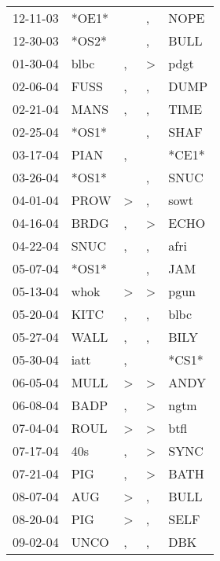 \begin{supertabular}{lllll}
 12-11-03 &  *OE1* &                  &                , &   NOPE \\
 12-30-03 &  *OS2* &                  &                , &   BULL \\
 01-30-04 &   blbc &                , &     \textgreater &   pdgt \\
 02-06-04 &   FUSS &                , &                , &   DUMP \\
 02-21-04 &   MANS &                , &                , &   TIME \\
 02-25-04 &  *OS1* &                  &                , &   SHAF \\
 03-17-04 &   PIAN &                , &                  &  *CE1* \\
 03-26-04 &  *OS1* &                  &                , &   SNUC \\
 04-01-04 &   PROW &     \textgreater &                , &   sowt \\
 04-16-04 &   BRDG &                , &     \textgreater &   ECHO \\
 04-22-04 &   SNUC &                , &                , &   afri \\
 05-07-04 &  *OS1* &                  &                , &    JAM \\
 05-13-04 &   whok &     \textgreater &     \textgreater &   pgun \\
 05-20-04 &   KITC &                , &                , &   blbc \\
 05-27-04 &   WALL &                , &                , &   BILY \\
 05-30-04 &   iatt &                , &                  &  *CS1* \\
 06-05-04 &   MULL &     \textgreater &     \textgreater &   ANDY \\
 06-08-04 &   BADP &                , &     \textgreater &   ngtm \\
 07-04-04 &   ROUL &     \textgreater &     \textgreater &   btfl \\
 07-17-04 &    40s &                , &     \textgreater &   SYNC \\
 07-21-04 &    PIG &                , &     \textgreater &   BATH \\
 08-07-04 &    AUG &     \textgreater &                , &   BULL \\
 08-20-04 &    PIG &     \textgreater &                , &   SELF \\
 09-02-04 &   UNCO &                , &                , &    DBK \\

\end{supertabular}
